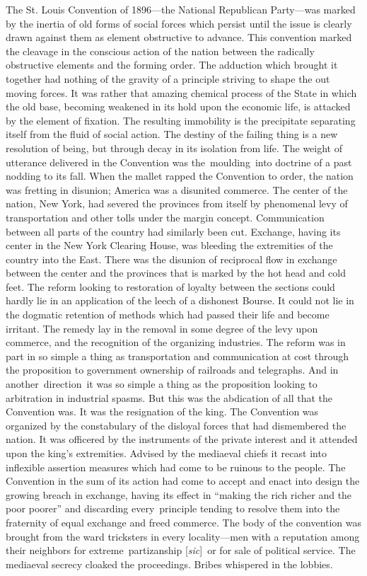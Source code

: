\documentclass[twoside,symmetric,nobib,justified]{tufte-book}
\begin{document}
The St. Louis Convention of 1896---the National Republican Party---was
marked by the inertia of old forms of social forces which persist until
the issue is clearly drawn against them as element obstructive to
advance. This convention marked the cleavage in the conscious action of
the nation between the radically obstructive elements and the forming
order. The adduction which brought it together had nothing of the
gravity of a principle striving to shape the out moving forces. It was
rather that amazing chemical process of the State in which the old base,
becoming weakened in its hold upon the economic life, is attacked by the
element of fixation. The resulting immobility is the precipitate
separating itself from the fluid of social action. The destiny of the
failing thing is a new resolution of being, but through decay in its
isolation from life. The weight of utterance delivered in the Convention
was the~moulding~into doctrine of a past nodding to its fall. When the
mallet rapped the Convention to order, the nation was fretting in
disunion; America was a disunited commerce. The center of the nation,
New York, had severed the provinces from itself by phenomenal levy of
transportation and other tolls under the margin concept. Communication
between all parts of the country had similarly been cut. Exchange,
having its center in the New York Clearing House, was bleeding the
extremities of the country into the East. There was the disunion of
reciprocal flow in exchange between the center and the provinces that is
marked by the hot head and cold feet. The reform looking to restoration
of loyalty between the sections could hardly lie in an application of
the leech of a dishonest Bourse. It could not lie in the dogmatic
retention of methods which had passed their life and become irritant.
The remedy lay in the removal in some degree of the levy upon commerce,
and the recognition of the organizing industries. The reform was in part
in so simple a thing as transportation and communication at cost through
the proposition to government ownership of railroads and telegraphs. And
in another~direction~it was so simple a thing as the proposition looking
to arbitration in industrial spasms. But this was the abdication of all
that the Convention was. It was the resignation of the king. The
Convention was organized by the constabulary of the disloyal forces that
had dismembered the nation. It was officered by the instruments of the
private interest and it attended upon the king's extremities. Advised by
the mediaeval chiefs it recast into inflexible assertion measures which
had come to be ruinous to the people. The Convention in the sum of its
action had come to accept and enact into design the growing breach in
exchange, having its effect in ``making the rich richer and the poor
poorer'' and discarding every~principle tending to resolve them into the
fraternity of equal exchange and freed commerce. The body of the
convention was brought from the ward tricksters in every locality---men
with a reputation among their neighbors for extreme~partizanship
{[}\emph{sic}{]}~or for sale of political service. The mediaeval secrecy
cloaked the proceedings. Bribes whispered in the lobbies.~
\end{document}
